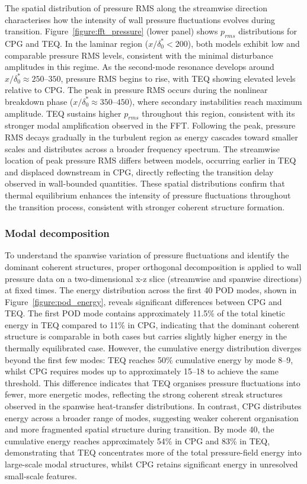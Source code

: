 The spatial distribution of pressure RMS along the streamwise direction characterises how the intensity of wall pressure fluctuations evolves during transition. Figure~\ref{figure:fft_pressure} (lower panel) shows $p_{rms}$ distributions for \gls{CPG} and \gls{TEQ}. In the laminar region ($x/\delta^*_0 < 200$), both models exhibit low and comparable pressure RMS levels, consistent with the minimal disturbance amplitudes in this regime. As the second-mode resonance develops around $x/\delta^*_0 \approx 250$--$350$, pressure RMS begins to rise, with \gls{TEQ} showing elevated levels relative to \gls{CPG}. The peak in pressure RMS occurs during the nonlinear breakdown phase ($x/\delta^*_0 \approx 350$--$450$), where secondary instabilities reach maximum amplitude. \gls{TEQ} sustains higher $p_{rms}$ throughout this region, consistent with its stronger modal amplification observed in the FFT. Following the peak, pressure RMS decays gradually in the turbulent region as energy cascades toward smaller scales and distributes across a broader frequency spectrum. The streamwise location of peak pressure RMS differs between models, occurring earlier in \gls{TEQ} and displaced downstream in \gls{CPG}, directly reflecting the transition delay observed in wall-bounded quantities. These spatial distributions confirm that thermal equilibrium enhances the intensity of pressure fluctuations throughout the transition process, consistent with stronger coherent structure formation.

\subsubsection{Modal decomposition}

To understand the spanwise variation of pressure fluctuations and identify the dominant coherent structures, proper orthogonal decomposition is applied to wall pressure data on a two-dimensional x-z slice (streamwise and spanwise directions) at fixed times. The energy distribution across the first 40 POD modes, shown in Figure~\ref{figure:pod_energy}, reveals significant differences between \gls{CPG} and \gls{TEQ}. The first POD mode contains approximately 11.5\% of the total kinetic energy in \gls{TEQ} compared to 11\% in \gls{CPG}, indicating that the dominant coherent structure is comparable in both cases but carries slightly higher energy in the thermally equilibrated case. However, the cumulative energy distribution diverges beyond the first few modes: \gls{TEQ} reaches 50\% cumulative energy by mode 8--9, whilst \gls{CPG} requires modes up to approximately 15--18 to achieve the same threshold. This difference indicates that \gls{TEQ} organises pressure fluctuations into fewer, more energetic modes, reflecting the strong coherent streak structures observed in the spanwise heat-transfer distributions. In contrast, \gls{CPG} distributes energy across a broader range of modes, suggesting weaker coherent organisation and more fragmented spatial structure during transition. By mode 40, the cumulative energy reaches approximately 54\% in \gls{CPG} and 83\% in \gls{TEQ}, demonstrating that \gls{TEQ} concentrates more of the total pressure-field energy into large-scale modal structures, whilst \gls{CPG} retains significant energy in unresolved small-scale features.

